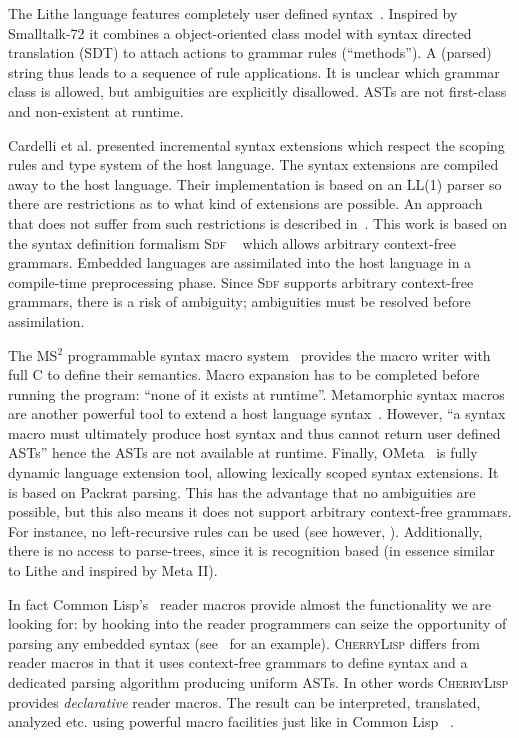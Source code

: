 \documentclass[a4paper]{llncs}
\def\cherrylisp{\textsc{CherryLisp}\xspace}
\begin{document}
The Lithe language features completely user defined
syntax~\cite{Lithe}. Inspired by Smalltalk-72 it combines a
object-oriented class model with syntax directed translation (SDT) to
attach actions to grammar rules (``methods''). A (parsed) string thus
leads to a sequence of rule applications.  It is unclear which grammar
class is allowed, but ambiguities are explicitly disallowed. ASTs are
not first-class and non-existent at runtime.

Cardelli et al.\cite{ExtensibleSyntax} presented incremental syntax
extensions which respect the scoping rules and type system of the host
language. The syntax extensions are compiled away to the host
language. Their implementation is based on an LL(1) parser so there
are restrictions as to what kind of extensions are possible. An
approach that does not suffer from such restrictions is described
in~\cite{ConcreteSyntaxForObjects}. This work is based on the syntax
definition formalism \textsc{Sdf} ~\cite{SDFManual,EelcoVisserThesis}
which allows arbitrary context-free grammars. Embedded languages are
assimilated into the host language in a compile-time preprocessing
phase. Since \textsc{Sdf} supports arbitrary context-free grammars,
there is a risk of ambiguity; ambiguities must be resolved before
assimilation.

The MS$^2$ programmable syntax macro
system~\cite{ProgrammableSyntaxMacros} provides the macro writer with
full C to define their semantics. Macro expansion has to be completed
before running the program: ``none of it exists at
runtime''. Metamorphic syntax macros are another powerful tool to
extend a host language syntax~\cite{MetaMorphic}. However, ``a syntax
macro must ultimately produce host syntax and thus cannot return user
defined ASTs'' hence the ASTs are not available at runtime.  Finally,
OMeta~\cite{OMeta} is fully dynamic language extension tool, allowing
lexically scoped syntax extensions. It is based on Packrat
parsing. This has the advantage that no ambiguities are possible, but
this also means it does not support arbitrary context-free
grammars. For instance, no left-recursive rules can be used (see
however, \cite{PackratLeftRec}). Additionally, there is no access to
parse-trees, since it is recognition based (in essence similar to
Lithe and inspired by Meta II\cite{MetaII}).

In fact Common Lisp's~\cite{CommonLispTL2} reader macros provide
almost the functionality we are looking for: by hooking into the
reader programmers can seize the opportunity of parsing any embedded
syntax (see~\cite{XExpressions} for an example). \cherrylisp differs
from reader macros in that it uses context-free grammars to define
syntax and a dedicated parsing algorithm producing uniform ASTs. In
other words \cherrylisp provides \textit{declarative} reader
macros. The result can be interpreted, translated, analyzed etc. using
powerful macro facilities just like in Common Lisp~ \cite{MacrosVSBlocks}. 
\end{document}

